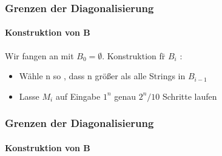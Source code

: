 \begin{frame}
	\frametitle{Grenzen der Diagonalisierung}
	\framesubtitle{Konstruktion von B}
	Wir fangen an mit $B_0 = \emptyset$. Konstruktion f\"r $B_i$ :
	\begin{itemize}
		\item Wähle n so , dass n größer als alle Strings in $B_{i-1}$
		\item Lasse $M_i$ auf Eingabe $1^n$ genau $2^n / 10$ Schritte laufen
	\end{itemize}
\end{frame}
\begin{frame}
	\frametitle{Grenzen der Diagonalisierung}
	\framesubtitle{Konstruktion von B}
	\begin{columns}
	

\end{columns}
\end{frame}
